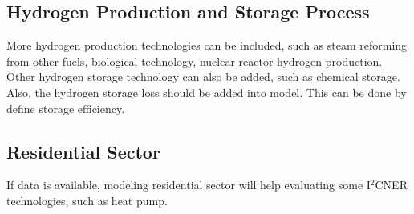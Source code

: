 \documentclass[14pt,a4paper]{article} %
\begin{document}
\subsection{Hydrogen Production and Storage Process}
More hydrogen production technologies can be included, such as steam reforming from other fuels, biological technology, nuclear reactor hydrogen production. Other hydrogen storage technology can also be added, such as chemical storage. Also, the hydrogen storage loss should be added into model. This can be done by define storage efficiency.

\subsection{Residential Sector}
If data is available, modeling residential sector will help evaluating some I$^2$CNER technologies, such as heat pump.




%


%

\end{document}
